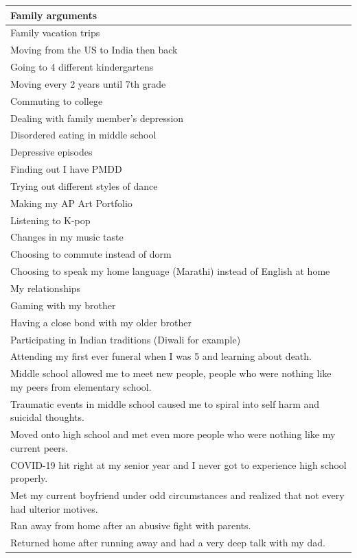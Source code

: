 \documentclass[
  .7em,
  letterpaper,
  DIV=11,
  numbers=noendperiod]{scrartcl}
\begin{document}
\begin{table}
\begin{tabular}{l}
\hline
Family arguments\\
\hline
Family vacation trips\\
\hline
Moving from the US to India then back\\
\hline
Going to 4 different kindergartens\\
\hline
Moving every 2 years until 7th grade\\
\hline
Commuting to college\\
\hline
Dealing with family member's depression\\
\hline
Disordered eating in middle school\\
\hline
Depressive episodes\\
\hline
Finding out I have PMDD\\
\hline
Trying out different styles of dance\\
\hline
Making my AP Art Portfolio\\
\hline
Listening to K-pop\\
\hline
Changes in my music taste\\
\hline
Choosing to commute instead of dorm\\
\hline
Choosing to speak my home language (Marathi) instead of English at home\\
\hline
My relationships\\
\hline
Gaming with my brother\\
\hline
Having a close bond with my older brother\\
\hline
Participating in Indian traditions (Diwali for example)\\
\hline
Attending my first ever funeral when I was 5 and learning about death.\\
\hline
Middle school allowed me to meet new people, people who were nothing like my peers from elementary school.\\
\hline
Traumatic events in middle school caused me to spiral into self harm and suicidal thoughts.\\
\hline
Moved onto high school and met even more people who were nothing like my current peers.\\
\hline
COVID-19 hit right at my senior year and I never got to experience high school properly.\\
\hline
Met my current boyfriend under odd circumstances and realized that not every had ulterior motives.\\
\hline
Ran away from home after an abusive fight with parents.\\
\hline
Returned home after running away and had a very deep talk with my dad.\\

\end{tabular}
\end{table}
\end{document}

